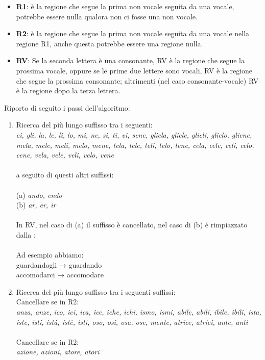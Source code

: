 \documentclass{article}
\theoremstyle{plain}
\theoremstyle{definition}
\begin{document}
\begin{itemize}
\item \textbf{R1}: è la regione che segue la prima non vocale seguita da una vocale, potrebbe essere nulla qualora non ci fosse una non vocale.
\item \textbf{R2}: è la regione che segue la prima non vocale seguita da una vocale nella regione R1, anche questa potrebbe essere una regione nulla.
\item \textbf{RV}: Se la seconda lettera è una consonante, RV è la regione che segue la prossima vocale, oppure se le prime due lettere sono vocali, RV è la regione che segue la prossima consonante; altrimenti (nel caso consonante-vocale) RV è la regione dopo la terza lettera.
\end{itemize}
Riporto di seguito i passi dell'algoritmo:
\begin{enumerate}
\item Ricerca del più lungo suffisso tra i seguenti:
\\
\textit{ci, gli, la, le, li, lo, mi, ne, si, ti, vi, sene, gliela, gliele, glieli, glielo, gliene, mela, mele, meli, melo, mene, tela, tele, teli, telo, tene, cela, cele, celi, celo, cene, vela, vele, veli, velo, vene}
\\
\\
a seguito di questi altri suffissi:
\\
\\
(a) \textit{ando, endo}
\\
(b) \textit{ar, er, ir}
\\
\\
In RV, nel caso di (a) il suffisso è cancellato, nel caso di (b) è rimpiazzato dalla :
\\
\\
Ad esempio abbiamo:
\\
guardandogli → guardando
\\
accomodarci → accomodare
\\
\item Ricerca del più lungo suffisso tra i seguenti suffissi:
\\
Cancellare se in R2:
\\
\textit{anza, anze, ico, ici, ica, ice, iche, ichi, ismo, ismi, abile, abili, ibile, ibili, ista, iste, isti, istà,  istè, istì, oso, osi, osa, ose, mente, atrice, atrici, ante, anti}
\\
\\
Cancellare se in R2:
\\
\textit{azione, azioni, atore, atori} 

\end{enumerate}
\end{document}
